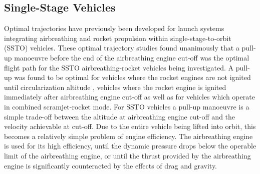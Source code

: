 \subsection{Single-Stage Vehicles}
Optimal trajectories have previously been developed for launch systems integrating airbreathing and rocket propulsion within single-stage-to-orbit (SSTO) vehicles\cite{Powell1991,Lu1993,Trefny1999,Roche2000,Pescetelli2012,Young2006,Bradford2000}. These optimal trajectory studies found unanimously that a pull-up manoeuvre before the end of the airbreathing engine cut-off was the optimal flight path for the SSTO airbreathing-rocket vehicles being investigated. A pull-up was found to be optimal for vehicles where the rocket engines are not ignited until circularization altitude \cite{Powell1991,Lu1993}, vehicles where the rocket engine is ignited immediately after airbreathing engine cut-off \cite{Trefny1999,Roche2000,Pescetelli2012} as well as for vehicles which operate in combined scramjet-rocket mode\cite{Young2006,Bradford2000}. For SSTO vehicles a pull-up manoeuvre is a simple trade-off between the altitude at airbreathing engine cut-off and the velocity achievable at cut-off. Due to the entire vehicle being lifted into orbit, this becomes a relatively simple problem of engine efficiency. The airbreathing engine is used for its high efficiency, until the dynamic pressure drops below the operable limit of the airbreathing engine, or until the thrust provided by the airbreathing engine is significantly counteracted by the effects of drag and gravity. 

